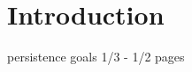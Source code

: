 

\chapter{Introduction}

\cite{microsoft-secure-windows-boot-process, microsoft-rootkits, veracode, kaspersky}
persistence
goals
1/3 - 1/2 pages


